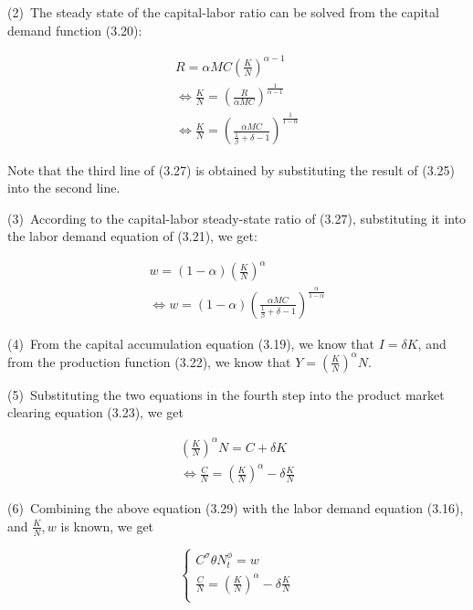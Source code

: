 \documentclass[10pt,math=newtx,citestyle=gb7714-2015,bibstyle=gb7714-2015]{elegantbook}
\begin{document}
	(2)~The steady state of the capital-labor ratio can be solved from the capital demand function (3.20):
	
	\begin{equation}\label{label}
		\begin{split}
			R=\alpha MC(\frac{K}{N})^{\alpha-1}\\
			\Leftrightarrow \frac{K}{N}=(\frac{R}{\alpha MC})^{\frac{1}{\alpha-1}}\\
			\Leftrightarrow \frac{K}{N}=(\frac{\alpha MC}{\frac{1}{\beta}+\delta-1})^{\frac{1}{1-\alpha}}
		\end{split}
	\end{equation}
	
	Note that the third line of (3.27) is obtained by substituting the result of (3.25) into the second line.
	
	(3)~According to the capital-labor steady-state ratio of (3.27), substituting it into the labor demand equation of (3.21), we get:
	
	\begin{equation}\label{label}
		\begin{split}
			w=(1-\alpha)(\frac{K}{N})^{\alpha}\\
			\Leftrightarrow w=(1-\alpha)(\frac{\alpha MC}{\frac{1}{\beta}+\delta-1})^{\frac{\alpha}{1-\alpha}}
		\end{split}
	\end{equation}
	
	(4)~From the capital accumulation equation (3.19), we know that $I=\delta K$, and from the production function (3.22), we know that $Y=(\frac{K}{N})^{\alpha}N$.
	
	(5)~Substituting the two equations in the fourth step into the product market clearing equation (3.23), we get
	
	\begin{equation}\label{label}
		\begin{split}
			(\frac{K}{N})^{\alpha}N=C+\delta K\\
			\Leftrightarrow \frac{C}{N}=(\frac{K}{N})^{\alpha}-\delta \frac{K}{N}
		\end{split}
	\end{equation}
	
	(6)~Combining the above equation (3.29) with the labor demand equation (3.16), and $\frac{K}{N},w$ is known, we get
	
	\begin{equation}\label{label}
		\left\{
		\begin{aligned}
			C^{\sigma}\theta N_t^{\phi}=w\\
			\frac{C}{N}=(\frac{K}{N})^{\alpha}-\delta \frac{K}{N}\\
		\end{aligned}
		\right.
	\end{equation}
	
\end{document}

